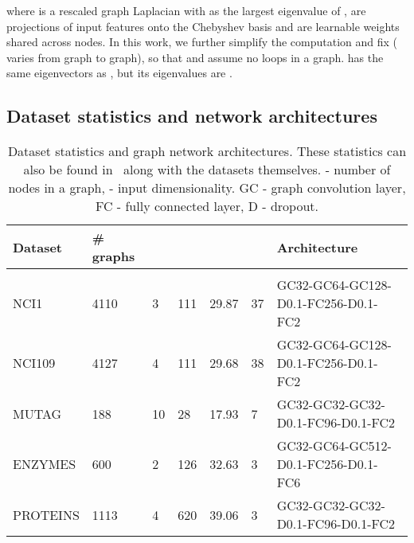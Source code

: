 \documentclass[final,nonatbib]{article} \usepackage{nips_2018}
\begin{document}
where  is a rescaled graph Laplacian with  as the largest eigenvalue of ,  are projections of input features onto the Chebyshev basis and  are learnable weights shared across nodes.
	In this work, we further simplify the computation and fix  ( varies from graph to graph), so that  and assume no loops in a graph.  has the same eigenvectors  as , but its eigenvalues are .

	\subsection{Dataset statistics and network architectures}

	\begin{table}[htp]
		\caption{Dataset statistics and graph network architectures.
		These statistics can also be found in~\cite{KKMMN2016} along with the datasets themselves.  - number of nodes in a graph,  - input dimensionality. GC - graph convolution layer, FC - fully connected layer, D - dropout.}
		\label{table:networks}
		\small
		\centering
		\setlength{\tabcolsep}{5pt}
		\begin{tabular}{lllllll}
			\textbf{Dataset}  & \textbf{\# graphs} &  &  &  &  & \textbf{Architecture} \\
			\hline \\
			NCI1 & 4110 & 3 & 111 & 29.87 & 37 & GC32-GC64-GC128-D0.1-FC256-D0.1-FC2 \\
			NCI109 & 4127 & 4 & 111 & 29.68 & 38 & GC32-GC64-GC128-D0.1-FC256-D0.1-FC2 \\
			MUTAG & 188 & 10 & 28 & 17.93 & 7 & GC32-GC32-GC32-D0.1-FC96-D0.1-FC2 \\
			ENZYMES & 600 & 2 & 126 & 32.63 & 3 & GC32-GC64-GC512-D0.1-FC256-D0.1-FC6 \\
			PROTEINS & 1113 & 4 & 620 & 39.06 & 3 & GC32-GC32-GC32-D0.1-FC96-D0.1-FC2 \\
		\end{tabular}
	\end{table}

	\vfill
\end{document}
